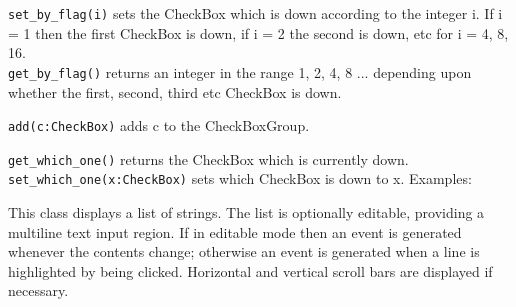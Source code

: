 \texttt{set\_by\_flag(i)} sets the CheckBox which is down according to the
integer i. If i = 1 then the first CheckBox is down, if i = 2 the
second is down, etc for i = 4, 8, 16.\\
\texttt{get\_by\_flag()} returns an integer in the range 1, 2, 4, 8 ... 
depending upon whether the first, second, third etc CheckBox is down.

\texttt{add(c:CheckBox)} adds c to the CheckBoxGroup.

\texttt{get\_which\_one()} returns the CheckBox which is currently down.\\
\texttt{set\_which\_one(x:CheckBox)} sets which CheckBox is down to x. Examples:



This class displays a list of strings. The list is optionally editable,
providing a multiline text input region. If in editable mode then an
event is generated whenever the contents change; otherwise an event is
generated when a line is highlighted by being clicked. Horizontal and
vertical scroll bars are displayed if necessary.

